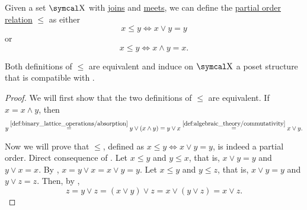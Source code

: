\begin{proposition}\label{thm:binary_lattice_operations_poset}
  Given a set \( \CX \) with \hyperref[def:binary_lattice_operations/join]{joins} and \hyperref[def:binary_lattice_operations/meet]{meets}, we can define the \hyperref[def:poset]{partial order relation} \( \leq \) as either
  \begin{equation*}
    x \leq y \iff x \vee y = y
  \end{equation*}
  or
  \begin{equation*}
    x \leq y \iff x \wedge y = x.
  \end{equation*}

  Both definitions of \( \leq \) are equivalent and induce on \( \CX \) a poset structure that is compatible with .
\end{proposition}
\begin{proof}
  We will first show that the two definitions of \( \leq \) are equivalent. If \( x = x \wedge y \), then
  \begin{equation*}
    y
    \overset {\ref{def:binary_lattice_operations/absorption}} =
    y \vee (x \wedge y)
    =
    y \vee x
    \overset {\ref{def:algebraic_theory/commutativity}} =
    x \vee y.
  \end{equation*}

  Now we will prove that \( \leq \), defined as \( x \leq y \iff x \vee y = y \), is indeed a partial order.
   Direct consequence of .
   Let \( x \leq y \) and \( y \leq x \), that is, \( x \vee y = y \) and \( y \vee x = x \). By , \( x = y \vee x = x \vee y = y \).
   Let \( x \leq y \) and \( y \leq z \), that is, \( x \vee y = y \) and \( y \vee z = z \). Then, by ,
  \begin{equation*}
    z = y \vee z = (x \vee y) \vee z = x \vee (y \vee z) = x \vee z.
  \end{equation*}
\end{proof}

